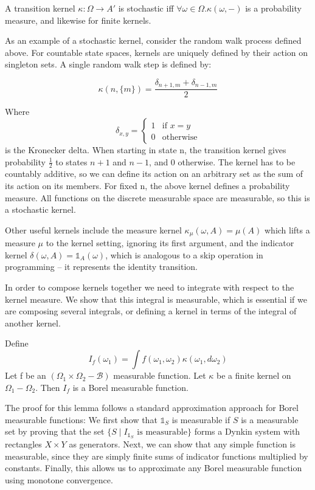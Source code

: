 \documentclass[orivec, envcountsame]{llncs}
\begin{document}
A transition kernel \(\kappa : \Omega \to A'\) is stochastic iff \(\forall \omega \in \Omega. \kappa(\omega, -)\) is a probability measure, and likewise for finite kernels.

As an example of a stochastic kernel, consider the random walk process defined above. For countable state spaces, kernels are uniquely defined by their action on singleton sets. A single random walk step is defined by:

\[\kappa(n, \{m\}) = \frac{\delta_{n+1, m} + \delta_{n-1, m}}{2}\]

Where \[\delta_{x,y} = \begin{cases}
    1 &\text{if } x = y\\
    0 &\text{otherwise}
\end{cases}\] is the Kronecker delta. When starting in state n, the transition kernel gives probability \(\frac{1}{2}\) to states \(n+1\) and \(n-1\), and 0 otherwise. The kernel has to be countably additive, so we can define its action on an arbitrary set as the sum of its action on its members. For fixed n, the above kernel defines a probability measure. All functions on the discrete measurable space are measurable, so this is a stochastic kernel.

Other useful kernels include the measure kernel \(\kappa_\mu(\omega, A) = \mu(A)\) which lifts a measure \(\mu\) to the kernel setting, ignoring its first argument, and the indicator kernel \(\delta(\omega, A) = \mathbb{1}_A(\omega)\), which is analogous to a skip operation in programming -- it represents the identity transition.

In order to compose kernels together we need to integrate with respect to the kernel measure. We show that this integral is measurable, which is essential if we are composing several integrals, or defining a kernel in terms of the integral of another kernel.
\begin{lemma}
    Define \[I_f(\omega_1) = \int f(\omega_1, \omega_2) \kappa(\omega_1, d\omega_2)\]
    Let f be an \((\Omega_1 \times \Omega_2 - \mathcal{B})\) measurable function. Let \(\kappa\) be a finite kernel on \(\Omega_1 - \Omega_2\). Then \(I_f\) is a Borel measurable function.
\end{lemma}

The proof for this lemma follows a standard approximation approach for Borel measurable functions:
 We first show that \(\mathbb{1}_S\) is measurable if \(S\) is a measurable set by proving that the set \(\{S \mid I_{\mathbb{1}_S} \text{ is measurable}\}\) forms a Dynkin system with rectangles \(X \times Y\) as generators. Next, we can show that any simple function is measurable, since they are simply finite sums of indicator functions multiplied by constants. Finally, this allows us to approximate any Borel measurable function using monotone convergence.
\end{document}
